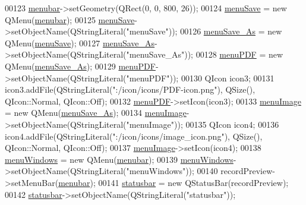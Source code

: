\begin{DoxyCode}
00123         \hyperlink{a00081_adddc4285028693f10dfd49cd08276e83}{menubar}->setGeometry(QRect(0, 0, 800, 26));
00124         \hyperlink{a00081_a5ef77bf8c78c201d83049ee8b40cf345}{menuSave} = \textcolor{keyword}{new} QMenu(\hyperlink{a00081_adddc4285028693f10dfd49cd08276e83}{menubar});
00125         \hyperlink{a00081_a5ef77bf8c78c201d83049ee8b40cf345}{menuSave}->setObjectName(QStringLiteral(\textcolor{stringliteral}{"menuSave"}));
00126         \hyperlink{a00081_aaf69c873ec3bf0ea397829122ca4a224}{menuSave\_As} = \textcolor{keyword}{new} QMenu(\hyperlink{a00081_a5ef77bf8c78c201d83049ee8b40cf345}{menuSave});
00127         \hyperlink{a00081_aaf69c873ec3bf0ea397829122ca4a224}{menuSave\_As}->setObjectName(QStringLiteral(\textcolor{stringliteral}{"menuSave\_As"}));
00128         \hyperlink{a00081_a4cdb6b113583d4ef43a08b5526c13e3a}{menuPDF} = \textcolor{keyword}{new} QMenu(\hyperlink{a00081_aaf69c873ec3bf0ea397829122ca4a224}{menuSave\_As});
00129         \hyperlink{a00081_a4cdb6b113583d4ef43a08b5526c13e3a}{menuPDF}->setObjectName(QStringLiteral(\textcolor{stringliteral}{"menuPDF"}));
00130         QIcon icon3;
00131         icon3.addFile(QStringLiteral(\textcolor{stringliteral}{":/icon/icons/PDF-icon.png"}), QSize(), QIcon::Normal, QIcon::Off);
00132         \hyperlink{a00081_a4cdb6b113583d4ef43a08b5526c13e3a}{menuPDF}->setIcon(icon3);
00133         \hyperlink{a00081_af1ff1ecbe6ea007cfeda320cca9865b7}{menuImage} = \textcolor{keyword}{new} QMenu(\hyperlink{a00081_aaf69c873ec3bf0ea397829122ca4a224}{menuSave\_As});
00134         \hyperlink{a00081_af1ff1ecbe6ea007cfeda320cca9865b7}{menuImage}->setObjectName(QStringLiteral(\textcolor{stringliteral}{"menuImage"}));
00135         QIcon icon4;
00136         icon4.addFile(QStringLiteral(\textcolor{stringliteral}{":/icon/icons/image\_icon.png"}), QSize(), QIcon::Normal, QIcon::Off);
00137         \hyperlink{a00081_af1ff1ecbe6ea007cfeda320cca9865b7}{menuImage}->setIcon(icon4);
00138         \hyperlink{a00081_afd93511da273fc2c6a88472d154cb176}{menuWindows} = \textcolor{keyword}{new} QMenu(\hyperlink{a00081_adddc4285028693f10dfd49cd08276e83}{menubar});
00139         \hyperlink{a00081_afd93511da273fc2c6a88472d154cb176}{menuWindows}->setObjectName(QStringLiteral(\textcolor{stringliteral}{"menuWindows"}));
00140         recordPreview->setMenuBar(\hyperlink{a00081_adddc4285028693f10dfd49cd08276e83}{menubar});
00141         \hyperlink{a00081_a5573ce6bc38b919d995ee7927b66c223}{statusbar} = \textcolor{keyword}{new} QStatusBar(recordPreview);
00142         \hyperlink{a00081_a5573ce6bc38b919d995ee7927b66c223}{statusbar}->setObjectName(QStringLiteral(\textcolor{stringliteral}{"statusbar"}));

\end{DoxyCode}
